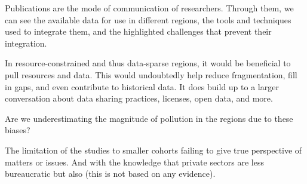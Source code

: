 \documentclass{article}
\begin{document}
Publications are the mode of communication of researchers. Through them, we can see the available data for use in different regions, the tools and techniques used to integrate them, and the highlighted challenges that prevent their integration.  

In resource-constrained and thus data-sparse regions, it would be beneficial to pull resources and data. This would undoubtedly help reduce fragmentation, fill in gaps, and even contribute to historical data. It does build up to a larger conversation about data sharing practices, licenses, open data, and more.  

Are we underestimating the magnitude of pollution in the regions due to these biases? 

The limitation of the studies to smaller cohorts failing to give true perspective of matters or issues. And with the knowledge that private sectors are less bureaucratic but also (this is not based on any evidence).
\end{document}
